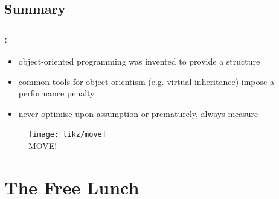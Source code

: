 \documentclass[9pt,xcolor=table]{beamer}
\begin{document}
\subsection{Summary}
\begin{frame}
\frametitle{\insertsectionhead{}: \insertsubsectionhead{}}

\begin{itemize}\large
\item object-oriented programming was invented to provide a structure
\item common tools for object-orientism (e.g. virtual inheritance) impose a performance penalty
\item never optimise upon assumption or prematurely, always measure
\end{itemize}
\vfill
\begin{figure}[htb]
\texttt{[image: tikz/move]}\\[6pt]\huge
MOVE!
\end{figure}
\vfill
\end{frame}

\section{The Free Lunch}
\end{document}
